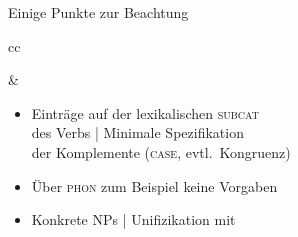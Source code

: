 \begin{frame}
  {Einige Punkte zur Beachtung}
  \onslide<+->
  \onslide<+->
  \centering 
  \begin{tabular}[h]{cc}
    \begin{minipage}{0.35\textwidth}
    \end{minipage} & %
    \begin{minipage}{0.55\textwidth}
      \begin{itemize}[<+->]
        \item Einträge auf der lexikalischen \textsc{subcat}\\
          des Verbs | Minimale Spezifikation\\
          der Komplemente (\textsc{case}, evtl.\ Kongruenz)
        \item Über \textsc{phon} zum Beispiel keine Vorgaben
        \item Konkrete NPs | \alert{Unifizikation} mit\\

\end{itemize}
\end{minipage}
\end{tabular}
\end{frame}
